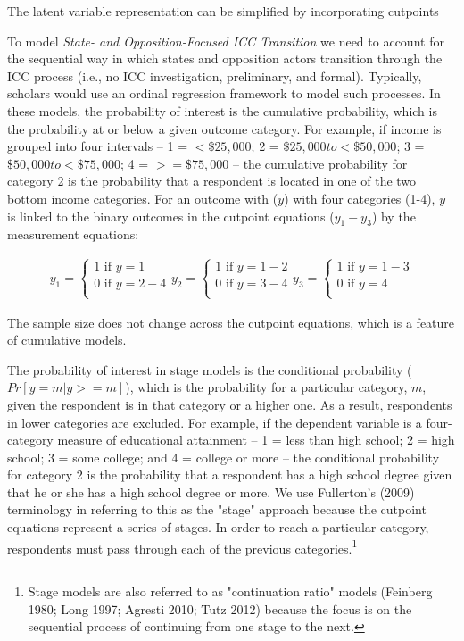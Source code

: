 The latent variable representation can be simplified by incorporating cutpoints

To model \emph{State- and Opposition-Focused ICC Transition} we need to account for the sequential way in which states and opposition actors transition through the ICC process (i.e., no ICC investigation, preliminary, and formal). Typically, scholars would use an ordinal regression framework to model such processes. In these models, the probability of interest is the cumulative probability, which is the probability at or below a given outcome category. For example, if income is grouped into four intervals -- 1 = $< \$25,000$; 2 = $\$25,000 to <\$50,000$; 3 = $\$50,000 to <\$75,000$; 4 = $>=\$75,000$ -- the cumulative probability for category 2 is the probability that a respondent is located in one of the two bottom income categories. For an outcome with ($y$) with four categories (1-4), $y$ is linked to the binary outcomes in the cutpoint equations ($y_{1} - y_{3}$) by the measurement equations:

\begin{eqnarray}
	y_{1} =
	\begin{cases}
	1 \text{ if } y = 1 \nonumber \\
	0 \text{ if } y = 2-4 \nonumber \\
\end{cases}
	y_{2} =
	\begin{cases}
	1 \text{ if } y = 1-2 \nonumber \\
	0 \text{ if } y = 3-4 \nonumber \\
\end{cases}
	y_{3} =
	\begin{cases}
	1 \text{ if } y = 1-3 \nonumber \\
	0 \text{ if } y = 4 \nonumber \\
\end{cases}
\end{eqnarray}

The sample size does not change across the cutpoint equations, which is a feature of cumulative models.

The probability of interest in stage models is the conditional probability ($Pr[ y = m | y >= m]$), which is the probability for a particular category, $m$, given the respondent is in that category or a higher one. As a result, respondents in lower categories are excluded. For example, if the dependent variable is a four-category measure of educational attainment -- 1 = less than high school; 2 = high school; 3 = some college; and 4 = college or more -- the conditional probability for category 2 is the probability that a respondent has a high school degree given that he or she has a high school degree or more. We use Fullerton's (2009) terminology in referring to this as the "stage" approach because the cutpoint equations represent a series of stages. In order to reach a particular category, respondents must pass through each of the previous categories.\footnote{Stage models are also referred to as "continuation ratio" models (Feinberg 1980; Long 1997; Agresti 2010; Tutz 2012) because the focus is on the sequential process of continuing from one stage to the next. }

